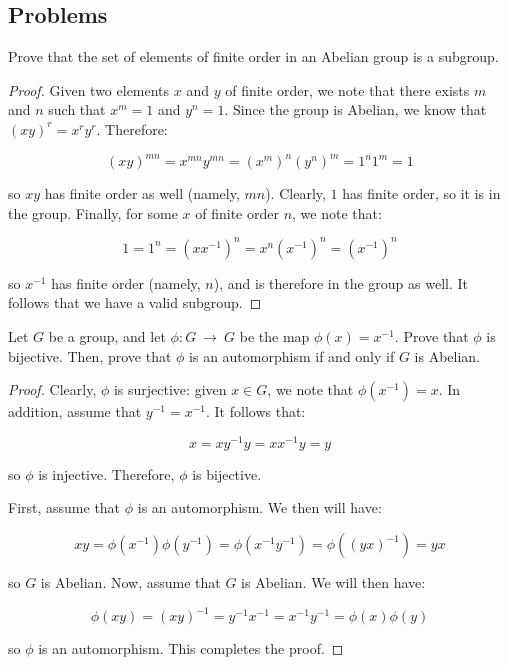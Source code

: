 \documentclass[10pt, oneside]{article}
\newenvironment{problem}[2][Problem]{\begin{trivlist}
\item[\hskip \labelsep {\bfseries #1}\hskip \labelsep {\bfseries #2.}]}{\end{trivlist}}
\begin{document}
    \subsection{Problems}

    \begin{problem}{2.21}
      Prove that the set of elements of finite order in an Abelian group is a subgroup.
    \end{problem}

    \begin{proof}
      Given two elements $x$ and $y$ of finite order, we note that there exists $m$ and $n$ such that $x^{m} = 1$ and $y^{n} = 1$. Since the group is Abelian,
      we know that $(xy)^{r} = x^{r} y^{r}$. Therefore:

      $$(xy)^{mn} = x^{mn} y^{mn} = (x^{m})^{n} (y^{n})^{m} = 1^n 1^m = 1$$

      so $xy$ has finite order as well (namely, $mn$). Clearly, $1$ has finite order, so it is in the group. Finally, for some $x$ of finite order $n$, we note that:

      $$1 = 1^{n} = (x x^{-1})^{n} = x^{n} (x^{-1})^n = (x^{-1})^n$$

      so $x^{-1}$ has finite order (namely, $n$), and is therefore in the group as well. It follows that we have a valid subgroup.
    \end{proof}

    \begin{problem}{3.12}
      Let $G$ be a group, and let $\phi : G \ \rightarrow \ G$ be the map $\phi(x) = x^{-1}$. Prove that $\phi$ is bijective. Then, prove that $\phi$ is an automorphism if and only if
      $G$ is Abelian.
    \end{problem}

    \begin{proof}
      Clearly, $\phi$ is surjective: given $x \in G$, we note that $\phi(x^{-1}) = x$. In addition, assume that $y^{-1} = x^{-1}$. It follows that:

      $$x = x y^{-1} y = x x^{-1} y = y$$

      so $\phi$ is injective. Therefore, $\phi$ is bijective.
      \newline

      First, assume that $\phi$ is an automorphism. We then will have:

      $$xy = \phi(x^{-1}) \phi(y^{-1}) = \phi(x^{-1} y^{-1}) = \phi((yx)^{-1}) = yx$$

      so $G$ is Abelian. Now, assume that $G$ is Abelian. We will then have:

      $$\phi(xy) = (xy)^{-1} = y^{-1} x^{-1} = x^{-1} y^{-1} = \phi(x) \phi(y)$$

      so $\phi$ is an automorphism. This completes the proof.
    \end{proof}
\end{document}

